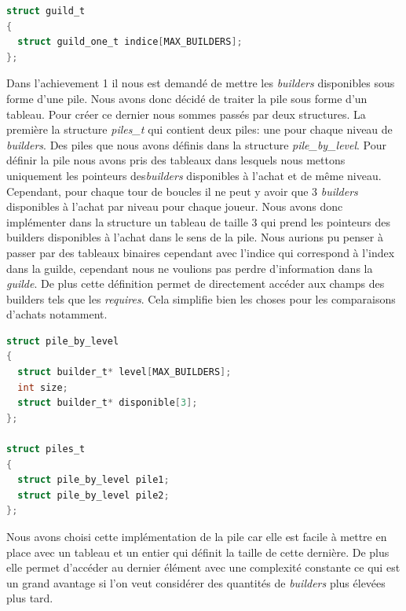 \documentclass{article}
\begin{document}
\begin{tcolorbox}[colback=gray!10,colframe=white!75!black]

\begin{lstlisting}[language=C, caption={La structure \texttt{guild\_t}}, label={lst:exemple40-c}]
struct guild_t 
{
  struct guild_one_t indice[MAX_BUILDERS];
};
\end{lstlisting}
\end{tcolorbox}
\vspace{1em}
\hspace{1em} Dans l'achievement 1 il nous est demandé de mettre les \emph{builders} disponibles sous forme d'une pile. Nous avons donc décidé de traiter la pile sous forme d'un tableau. Pour créer ce dernier nous sommes passés par deux structures. La première la structure \emph{piles\_t} qui contient deux piles: une pour chaque niveau de \emph{builders}. Des piles que nous avons définis dans la structure \emph{pile\_by\_level}. Pour définir la pile nous avons pris des tableaux dans lesquels nous mettons uniquement les  pointeurs des\emph{builders} disponibles à l'achat et de même niveau. Cependant, pour chaque tour de boucles il ne peut y avoir que 3 \emph{builders} disponibles à l'achat par niveau pour chaque joueur. Nous avons donc implémenter dans la structure un tableau de taille 3 qui prend les pointeurs des builders disponibles à l'achat dans le sens de la pile. Nous aurions pu penser à passer par des tableaux binaires cependant avec l'indice qui correspond à l'index dans la guilde, cependant nous ne voulions pas perdre d'information dans la \emph{guilde}. De plus cette définition permet de directement accéder aux champs des builders tels que les \emph{requires}. Cela simplifie bien les choses pour les comparaisons d'achats notamment.


\begin{tcolorbox}[colback=gray!10,colframe=white!75!black]
\begin{lstlisting}[language=C, caption={la structures piles\_t}, label={lst:exemple5-c}]
struct pile_by_level
{
  struct builder_t* level[MAX_BUILDERS];
  int size;
  struct builder_t* disponible[3]; 
};

struct piles_t 
{
  struct pile_by_level pile1;
  struct pile_by_level pile2;
};
\end{lstlisting}
\end{tcolorbox}

Nous avons choisi cette implémentation de la pile car elle est facile à mettre en place avec un tableau et un entier qui définit la taille de cette dernière. De plus elle permet d'accéder au dernier élément avec une complexité constante ce qui est un grand avantage si l'on veut considérer des quantités de \emph{builders} plus élevées plus tard. 
\end{document}
